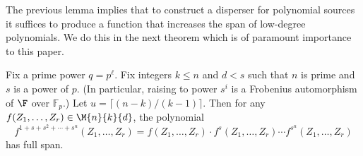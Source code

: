 %
%
%
%
%
%
The previous lemma implies that to construct a disperser for
polynomial sources it suffices to produce a function that increases
the span of low-degree polynomials.  We do this in the next
theorem which is of paramount importance to this paper.
%
\begin{theorem}\label{thm-spanning_poly}
Fix a prime power $q=p^{\ell}$. Fix integers $k\leq n$ and $d<s$ such that $n$ is prime
and $s$ is a power of $p$. (In particular, raising to power $s^i$ is a Frobenius automorphism of $\F$ over $\mathbb{F}_p$.)
Let $u= \lceil (n-k)/(k-1)\rceil $.
Then for any $f(Z_1,\ldots,Z_r)\in \M{n}{k}{d}$, the polynomial
\[f^{1+s+s^2+\cdots +  s^u}(Z_1,\ldots,Z_r)=f(Z_1,\ldots,Z_r)\cdot f^s(Z_1,\ldots,Z_r)\cdots f^{s^u}(Z_1,\ldots,Z_r)\] has full span.
%
%
%
\end{theorem}
